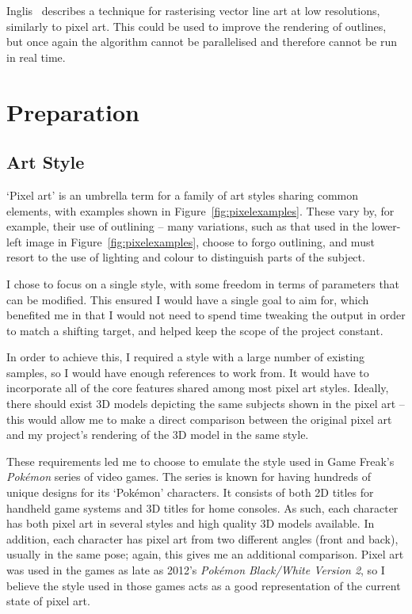 \documentclass[12pt,twoside,notitlepage]{report}
\begin{document}
Inglis~\cite{Inglis:2012:PVL:2330147.2330153} describes a technique for rasterising vector line art at low resolutions, similarly to pixel art. This could be used to improve the rendering of outlines, but once again the algorithm cannot be parallelised and therefore cannot be run in real time.

\chapter{Preparation}

\section{Art Style}

`Pixel art' is an umbrella term for a family of art styles sharing common elements, with examples shown in Figure~\ref{fig:pixelexamples}. These vary by, for example, their use of outlining -- many variations, such as that used in the lower-left image in Figure~\ref{fig:pixelexamples}, choose to forgo outlining, and must resort to the use of lighting and colour to distinguish parts of the subject.

I chose to focus on a single style, with some freedom in terms of parameters that can be modified. This ensured I would have a single goal to aim for, which benefited me in that I would not need to spend time tweaking the output in order to match a shifting target, and helped keep the scope of the project constant.

In order to achieve this, I required a style with a large number of existing samples, so I would have enough references to work from. It would have to incorporate all of the core features shared among most pixel art styles. Ideally, there should exist 3D models depicting the same subjects shown in the pixel art -- this would allow me to make a direct comparison between the original pixel art and my project's rendering of the 3D model in the same style.

These requirements led me to choose to emulate the style used in Game Freak's \textit{Pok\'{e}mon} series of video games. The series is known for having hundreds of unique designs for its `Pok\'{e}mon' characters. It consists of both 2D titles for handheld game systems and 3D titles for home consoles. As such, each character has both pixel art in several styles and high quality 3D models available. In addition, each character has pixel art from two different angles (front and back), usually in the same pose; again, this gives me an additional comparison. Pixel art was used in the games as late as 2012's \textit{Pok\'{e}mon Black/White Version 2}, so I believe the style used in those games acts as a good representation of the current state of pixel art.
\end{document}
